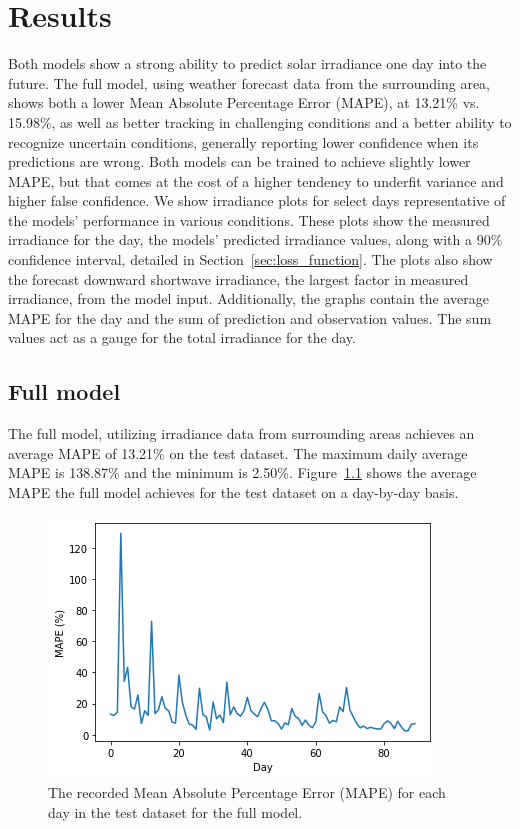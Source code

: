 \chapter{Results}
Both models show a strong ability to predict solar irradiance one day into the future.
The full model, using weather forecast data from the surrounding area, shows both a lower Mean Absolute Percentage Error (MAPE), at 13.21\% vs. 15.98\%, as well as better tracking in challenging conditions and a better ability to recognize uncertain conditions, generally reporting lower confidence when its predictions are wrong. Both models can be trained to achieve slightly lower MAPE, but that comes at the cost of a higher tendency to underfit variance and higher false confidence.
We show irradiance plots for select days representative of the models' performance in various conditions. These plots show the measured irradiance for the day, the models' predicted irradiance values, along with a 90\% confidence interval, detailed in Section~\ref{sec:loss_function}. The plots also show the forecast downward shortwave irradiance, the largest factor in measured irradiance, from the model input. Additionally, the graphs contain the average MAPE for the day and the sum of prediction and observation values. The sum values act as a gauge for the total irradiance for the day.


\section{Full model}
The full model, utilizing irradiance data from surrounding areas achieves an average MAPE of 13.21\% on the test dataset. The maximum daily average MAPE is 138.87\% and the minimum is 2.50\%. Figure~\ref{fig:days_full} shows the average MAPE the full model achieves for the test dataset on a day-by-day basis.
\begin{figure}[ht!]
    \centering
    \includegraphics[scale=1]{imgs/graphs/full/days_full.png}
    \caption{The recorded Mean Absolute Percentage Error (MAPE) for each day in the test dataset for the full model. 
    \label{fig:days_full}}
\end{figure}




